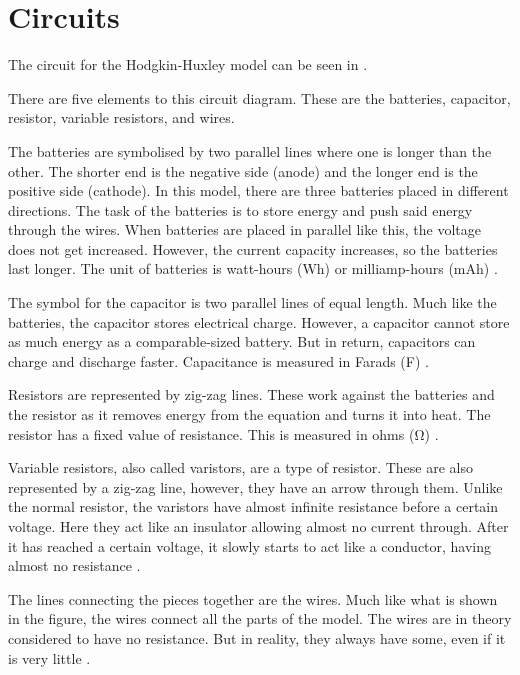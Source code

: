 \documentclass[../../Orator]{subfiles}
\begin{document}
 
 

\section{Circuits}
The circuit for the Hodgkin-Huxley model can be seen in . 



There are five elements to this circuit diagram. These are the batteries, capacitor, resistor, variable resistors, and wires. 

The batteries are symbolised by two parallel lines where one is longer than the other. The shorter end is the negative side (anode) and the longer end is the positive side (cathode). In this model, there are three batteries placed in different directions. The task of the batteries is to store energy and push said energy through the wires. When batteries are placed in parallel like this, the voltage does not get increased. However, the current capacity increases, so the batteries last longer. The unit of batteries is watt-hours (Wh) or milliamp-hours (mAh) \cite{}. 

The symbol for the capacitor is two parallel lines of equal length. Much like the batteries, the capacitor stores electrical charge. However, a capacitor cannot store as much energy as a comparable-sized battery. But in return, capacitors can charge and discharge faster. Capacitance is measured in Farads (\unit{\farad}) \cite{}.

Resistors are represented by zig-zag lines. These work against the batteries and the resistor as it removes energy from the equation and turns it into heat. The resistor has a fixed value of resistance. This is measured in ohms (\unit{\ohm}) \cite{}.

Variable resistors, also called varistors, are a type of resistor. These are also represented by a zig-zag line, however, they have an arrow through them. Unlike the normal resistor, the varistors have almost infinite resistance before a certain voltage. Here they act like an insulator allowing almost no current through. After it has reached a certain voltage, it slowly starts to act like a conductor, having almost no resistance \cite{}. 

The lines connecting the pieces together are the wires. Much like what is shown in the figure, the wires connect all the parts of the model. The wires are in theory considered to have no resistance. But in reality, they always have some, even if it is very little \cite{}. 
\end{document}
